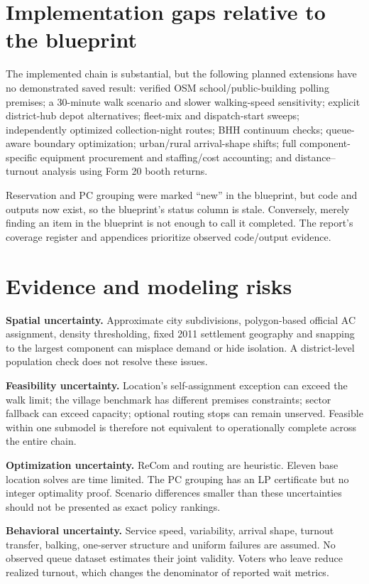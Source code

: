 \documentclass[11pt,a4paper,oneside]{report}
\newcommand{\source}[1]{\par\nopagebreak[4]{\footnotesize\color{teal}Evidence: #1.}\par}
\begin{document}
\section{Implementation gaps relative to the blueprint}
The implemented chain is substantial, but the following planned extensions have no demonstrated saved result: verified OSM school/public-building polling premises; a 30-minute walk scenario and slower walking-speed sensitivity; explicit district-hub depot alternatives; fleet-mix and dispatch-start sweeps; independently optimized collection-night routes; BHH continuum checks; queue-aware boundary optimization; urban/rural arrival-shape shifts; full component-specific equipment procurement and staffing/cost accounting; and distance--turnout analysis using Form 20 booth returns.

Reservation and PC grouping were marked ``new'' in the blueprint, but code and outputs now exist, so the blueprint's status column is stale. Conversely, merely finding an item in the blueprint is not enough to call it completed. The report's coverage register and appendices prioritize observed code/output evidence.
\source{[S7]--[S16]}

\section{Evidence and modeling risks}
\textbf{Spatial uncertainty.} Approximate city subdivisions, polygon-based official AC assignment, density thresholding, fixed 2011 settlement geography and snapping to the largest component can misplace demand or hide isolation. A district-level population check does not resolve these issues.

\textbf{Feasibility uncertainty.} Location's self-assignment exception can exceed the walk limit; the village benchmark has different premises constraints; sector fallback can exceed capacity; optional routing stops can remain unserved. Feasible within one submodel is therefore not equivalent to operationally complete across the entire chain.

\textbf{Optimization uncertainty.} ReCom and routing are heuristic. Eleven base location solves are time limited. The PC grouping has an LP certificate but no integer optimality proof. Scenario differences smaller than these uncertainties should not be presented as exact policy rankings.

\textbf{Behavioral uncertainty.} Service speed, variability, arrival shape, turnout transfer, balking, one-server structure and uniform failures are assumed. No observed queue dataset estimates their joint validity. Voters who leave reduce realized turnout, which changes the denominator of reported wait metrics.
\end{document}
